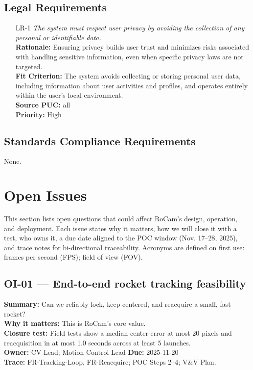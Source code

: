 \documentclass[12pt]{article}
\begin{document}
\subsection{Legal Requirements}
\begin{itemize}[leftmargin=*]
  \item[LR-1] \emph{The system must respect user privacy by avoiding the collection of
          any personal or identifiable data.}\\[2mm]
        \textbf{Rationale:} Ensuring privacy builds user trust and minimizes risks associated with handling sensitive information, even when specific privacy laws are not targeted.\\
        \textbf{Fit Criterion:} The system avoids collecting or storing personal user data, including information about user activities and profiles, and operates entirely within the user's local environment.\\
        \textbf{Source PUC:} all \\
        \textbf{Priority:} High
\end{itemize}

\subsection{Standards Compliance Requirements}

None.

\section{Open Issues}
\label{sec:open-issues}

This section lists open questions that could affect RoCam’s design, operation,
and deployment. Each issue states why it matters, how we will close it with a
test, who owns it, a due date aligned to the POC window (Nov. 17–28, 2025), and
trace notes for bi-directional traceability. Acronyms are defined on first use:
frames per second (FPS); field of view (FOV).

\subsection*{OI-01 — End-to-end rocket tracking feasibility}
\textbf{Summary:} Can we reliably lock, keep centered, and reacquire a small, fast rocket?\\
\textbf{Why it matters:} This is RoCam’s core value.\\
\textbf{Closure test:} Field tests show a median center error at most 20 pixels and reacquisition in at most 1.0 seconds across at least 5 launches.\\
\textbf{Owner:} CV Lead; Motion Control Lead \quad \textbf{Due:} 2025-11-20\\
\textbf{Trace:} FR-Tracking-Loop, FR-Reacquire; POC Steps 2–4; V\&V Plan.
\end{document}
